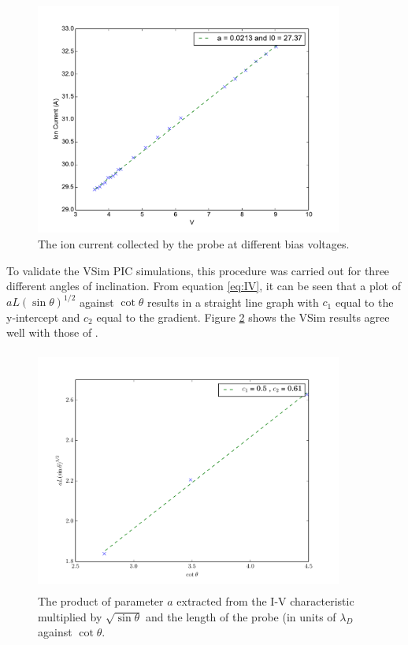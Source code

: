 \begin{figure}[H]
	\centering
	\includegraphics[width=0.9\textwidth]{a_no_gap.pdf}
	\caption{The ion current collected by the probe at different bias voltages. }
	\label{fig:a_no_gap}
\end{figure}

To validate the VSim PIC simulations, this procedure was carried out for three different angles of inclination. From equation \ref{eq:IV}, it can be seen that a plot of $a L {(\sin \theta)}^{1/2}$ against $\cot \theta$ results in a straight line graph with $c_1$ equal to the y-intercept and $c_2$ equal to the gradient. Figure \ref{fig:no_gap_c1} shows the VSim results agree well with those of \cite{Bergmann-2002}.

\begin{figure}[H]
	\centering
	\includegraphics[width=0.9\textwidth, height = 8cm]{no_gap_c1_c2.pdf}
	\caption{The product of parameter $a$ extracted from the I-V characteristic multiplied by $\sqrt{\sin \theta}$ and the length of the probe (in units of $\lambda_D$ against $\cot \theta$. }
	\label{fig:no_gap_c1}
\end{figure}

